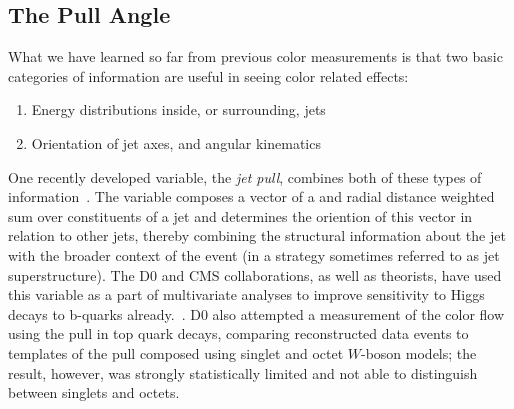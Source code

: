 \subsection{The Pull Angle}

What we have learned so far from previous color measurements is that two basic categories of information are useful in seeing color related effects:
%
\begin{enumerate}
\item Energy distributions inside, or surrounding, jets
\item Orientation of jet axes, and angular kinematics 
\end{enumerate}
%
One recently developed variable, the \textit{jet pull}, combines both of these types of information~\cite{Gallicchio:2010sw}. The variable composes a vector of a \pt and radial distance weighted sum over constituents of a jet and determines the oriention of this vector in relation to other jets, thereby combining the structural information about the jet with the broader context of the event (in a strategy sometimes referred to as jet superstructure). The D0 and CMS collaborations, as well as theorists, have used this variable as a part of multivariate analyses to improve sensitivity to Higgs decays to b-quarks already.~\cite{D0higgs,CMShiggspap,CMShiggspap2}. D0 also attempted a measurement of the color flow using the pull in top quark decays, comparing reconstructed data events to templates of the pull composed using singlet and octet $W$-boson models; the result, however, was strongly statistically limited and not able to distinguish between singlets and octets.

